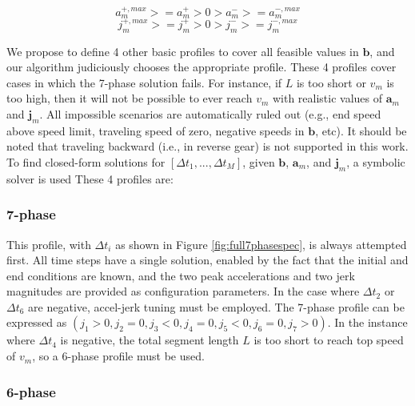 \documentclass[letterpaper, 10 pt, conference]{ieeeconf}  %
\begin{document}
\begin{equation}
  a^{+,max}_m >= a^+_m > 0 > a^-_m >= a^{-,max}_m
  \label{eq:am}
\end{equation}
\begin{equation}
  j^{+,max}_m >= j^+_m > 0 > j^-_m >= j^{-,max}_m
  \label{eq:jm}
\end{equation}

We propose to define 4 other basic profiles to cover all feasible values in $\mathbf{b}$, and our algorithm judiciously chooses the appropriate profile. These 4 profiles cover cases in which the 7-phase solution fails. For instance, if $L$ is too short or $v_m$ is too high, then it will not be possible to ever reach $v_m$ with realistic values of $\mathbf{a}_m$ and $\mathbf{j}_m$.
All impossible scenarios are automatically ruled out (e.g., end speed above speed limit, traveling speed of zero, negative speeds in $\mathbf{b}$, etc).
It should be noted that traveling backward (i.e., in reverse gear) is not supported in this work.
To find closed-form solutions for $[\Delta t_1, ..., \Delta t_M]$, given $\mathbf{b}$, $\mathbf{a}_m$, and $\mathbf{j}_m$, a symbolic solver is used 
These 4 profiles are:

\subsubsection{7-phase} \label{sec:7phase}

This profile, with $\Delta t_i$ as shown in Figure \ref{fig:full7phasespec}, is always attempted first.
All time steps have a single solution, enabled by the fact that the initial and end conditions are known, and the two peak accelerations and two jerk magnitudes are provided as configuration parameters.
In the case where $\Delta t_2$ or $\Delta t_6$ are negative, accel-jerk tuning must be employed.
The 7-phase profile can be expressed as $( j_1 > 0 , j_2 = 0 , j_3 < 0 , j_4 = 0 , j_5 < 0 , j_6 = 0 , j_7 > 0 )$.
In the instance where $\Delta t_4$ is negative, the total segment length $L$ is too short to reach top speed of $v_m$, so a 6-phase profile must be used.

\subsubsection{6-phase} \label{sec:6phase}
\end{document}

